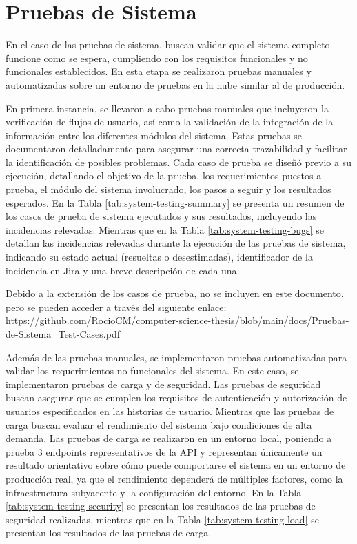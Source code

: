 \section{Pruebas de Sistema}

En el caso de las pruebas de sistema, buscan validar que el sistema completo funcione como se espera, cumpliendo con los requisitos funcionales y no funcionales establecidos. En esta etapa se realizaron pruebas manuales y automatizadas sobre un entorno de pruebas en la nube similar al de producción.

En primera instancia, se llevaron a cabo pruebas manuales que incluyeron la verificación de flujos de usuario, así como la validación de la integración de la información entre los diferentes módulos del sistema. Estas pruebas se documentaron detalladamente para asegurar una correcta trazabilidad y facilitar la identificación de posibles problemas. Cada caso de prueba se diseñó previo a su ejecución, detallando el objetivo de la prueba, los requerimientos puestos a prueba, el módulo del sistema involucrado, los pasos a seguir y los resultados esperados. En la Tabla \ref{tab:system-testing-summary} se presenta un resumen de los casos de prueba de sistema ejecutados y sus resultados, incluyendo las incidencias relevadas. Mientras que en la Tabla \ref{tab:system-testing-bugs} se detallan las incidencias relevadas durante la ejecución de las pruebas de sistema, indicando su estado actual (resueltas o desestimadas), identificador de la incidencia en Jira y una breve descripción de cada una.

Debido a la extensión de los casos de prueba, no se incluyen en este documento, pero se pueden acceder a través del siguiente enlace: \href{https://github.com/RocioCM/computer-science-thesis/blob/main/docs/Pruebas-de-Sistema_Test-Cases.pdf}{https://github.com/RocioCM/computer-science-thesis/blob/main/docs/Pruebas-de-Sistema_Test-Cases.pdf}

Además de las pruebas manuales, se implementaron pruebas automatizadas para validar los requerimientos no funcionales del sistema. En este caso, se implementaron pruebas de carga y de seguridad. Las pruebas de seguridad buscan asegurar que se cumplen los requisitos de autenticación y autorización de usuarios especificados en las historias de usuario. Mientras que las pruebas de carga buscan evaluar el rendimiento del sistema bajo condiciones de alta demanda. Las pruebas de carga se realizaron en un entorno local, poniendo a prueba 3 endpoints representativos de la API y representan únicamente un resultado orientativo sobre cómo puede comportarse el sistema en un entorno de producción real, ya que el rendimiento dependerá de múltiples factores, como la infraestructura subyacente y la configuración del entorno. En la Tabla \ref{tab:system-testing-security} se presentan los resultados de las pruebas de seguridad realizadas, mientras que en la Tabla \ref{tab:system-testing-load} se presentan los resultados de las pruebas de carga.

